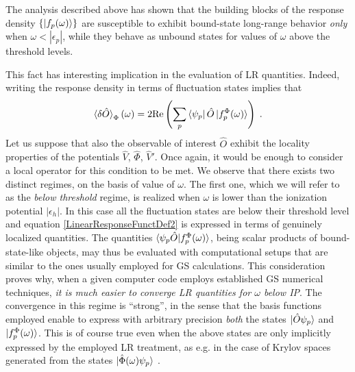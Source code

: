 \documentclass[reprint,aps,prb]{revtex4-1}
\newcommand{\eps}{\epsilon}
\newcommand{\be}{\begin{equation}}
\newcommand{\ee}{\end{equation}}
\newcommand{\lb}{\label}
\newcommand{\op}[1]{\hat {#1}}
\begin{document}
The analysis described above has shown that the building blocks of the response density $\{\ket{f_p(\omega)}\}$ 
are susceptible to exhibit bound-state long-range behavior \emph{only} when $\omega < |\eps_p|$, 
while they behave as unbound states for values of $\omega$ above the threshold levels.

This fact has interesting implication in the evaluation of LR quantities. Indeed, writing the response 
density in terms of fluctuation states implies that 
\be\lb{LinearResponseFunctDef2}
\braket{\delta\op O}_\Phi(\omega) = 2\mathrm{Re} \left(\sum_p \bra{\psi_p}\op O\ket{f_p^\Phi(\omega)}\right) \;.
\ee
Let us suppose that also the observable of interest $\op O$ exhibit the locality properties of the potentials $ \op V$, $\op \Phi$, $\op V'$.
Once again, it would be enough to consider a local operator for this condition to be met.
We observe that there exists two 
distinct regimes, on the basis of value of $\omega$. 
The first one, which we will refer to as the \emph{below threshold} regime, is realized when
$\omega$ is lower than the ionization potential $|\eps_h|$.
In this case all the fluctuation states are below their threshold level and equation \eqref{LinearResponseFunctDef2} 
is expressed in terms of genuinely localized 
quantities. The quantities $\braket{\psi_p \op O| f_p^\Phi(\omega)}$, 
being scalar products of bound-state-like objects, may thus be evaluated with computational setups that
are similar to the ones usually employed for GS calculations.
This consideration proves why, when a given computer code employs established GS numerical techniques, 
\emph{it is much easier to converge LR quantities for $\omega$ below IP}.
The convergence in this regime is ``strong'', in the sense that the basis functions employed enable to express 
with arbitrary precision \emph{both} the states $\ket{\op O \psi_p}$ and $\ket{f_p^\Phi(\omega)}$.
This is of course true even when the above states are only implicitly expressed by the employed LR treatment,
 as e.g. in the case of Krylov spaces generated from the states $\ket{\op\Phi(\omega) \psi_p}$ \cite{baroni2006,baroni2008,linlinKPM}.


\end{document}
